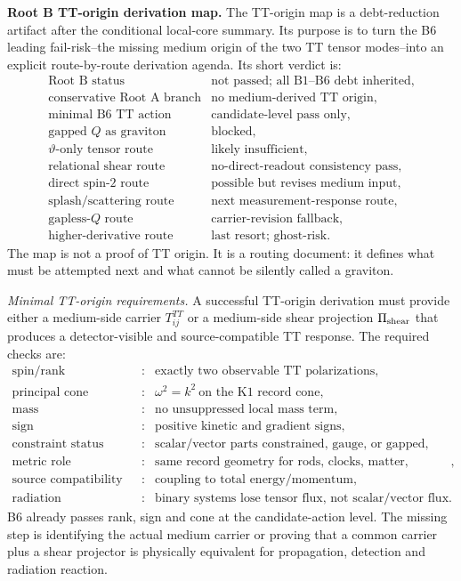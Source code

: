 \documentclass[11pt]{article}
\begin{document}
\medskip\noindent\textbf{Root B TT-origin derivation map.}
The TT-origin map is a debt-reduction artifact after the conditional
local-core summary.  Its purpose is to turn the B6 leading fail-risk--the
missing medium origin of the two TT tensor modes--into an explicit
route-by-route derivation agenda.  Its short verdict is:
\[
\boxed{
\begin{array}{ll}
\text{Root B status} & \text{not passed; all B1--B6 debt inherited},\\
\text{conservative Root A branch} & \text{no medium-derived TT origin},\\
\text{minimal B6 TT action} & \text{candidate-level pass only},\\
\text{gapped }Q\text{ as graviton} & \text{blocked},\\
\vartheta\text{-only tensor route} & \text{likely insufficient},\\
\text{relational shear route} & \text{no-direct-readout consistency pass},\\
\text{direct spin-2 route} & \text{possible but revises medium input},\\
\text{splash/scattering route} & \text{next measurement-response route},\\
\text{gapless-}Q\text{ route} & \text{carrier-revision fallback},\\
\text{higher-derivative route} & \text{last resort; ghost-risk}.
\end{array}}
\]
The map is not a proof of TT origin.  It is a routing document: it defines
what must be attempted next and what cannot be silently called a graviton.

\medskip\noindent\textit{Minimal TT-origin requirements.}
A successful TT-origin derivation must provide either a medium-side carrier
\(T^{TT}_{ij}\) or a medium-side shear projection \(\Pi_{\rm shear}\) that
produces a detector-visible and source-compatible TT response.  The required
checks are:
\[
\boxed{
\begin{array}{lll}
\text{spin/rank} &:& \text{exactly two observable TT polarizations},\\
\text{principal cone} &:& \omega^2=k^2\ \text{on the K1 record cone},\\
\text{mass} &:& \text{no unsuppressed local mass term},\\
\text{sign} &:& \text{positive kinetic and gradient signs},\\
\text{constraint status} &:& \text{scalar/vector parts constrained, gauge, or gapped},\\
\text{metric role} &:& \text{same record geometry for rods, clocks, matter, constraints},\\
\text{source compatibility} &:& \text{coupling to total energy/momentum},\\
\text{radiation compatibility} &:& \text{binary systems lose tensor flux, not scalar/vector flux}.
\end{array}}
\]
B6 already passes rank, sign and cone at the candidate-action level.  The
missing step is identifying the actual medium carrier or proving that a common
carrier plus a shear projector is physically equivalent for propagation,
detection and radiation reaction.
\end{document}
